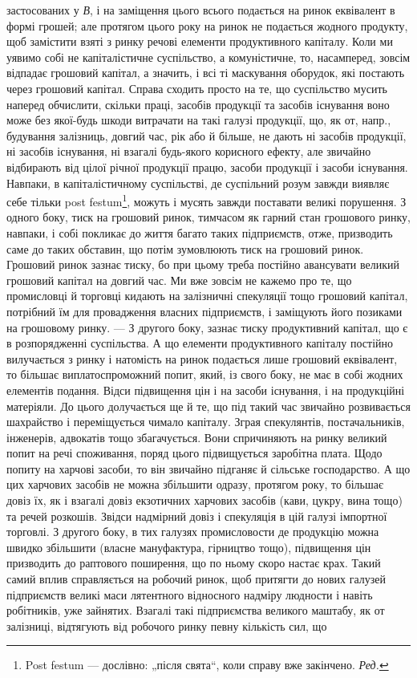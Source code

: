 \parcont{}  %
застосованих у \emph{В}, і на заміщення цього всього подається на ринок еквівалент
в формі грошей; але протягом цього року на ринок не подається
жодного продукту, щоб замістити взяті з ринку речові елементи продуктивного
капіталу. Коли ми уявимо собі не капіталістичне суспільство,
а комуністичне, то, насамперед, зовсім відпадає грошовий капітал, а значить,
і всі ті маскування оборудок, які постають через грошовий капітал.
Справа сходить просто на те, що суспільство мусить наперед обчислити,
скільки праці, засобів продукції та засобів існування воно може без якої-будь
шкоди витрачати на такі галузі продукції, що, як от, напр., будування
залізниць, довгий час, рік або й більше, не дають ні засобів
продукції, ні засобів існування, ні взагалі будь-якого корисного ефекту,
але звичайно відбирають від цілої річної продукції працю, засоби продукції
і засоби існування. Навпаки, в капіталістичному суспільстві, де
суспільний розум завжди виявляє себе тільки post festum\footnote*{
Post festum — дослівно: „після свята“, коли справу вже закінчено. \emph{Ред.}
}, можуть і мусять
завжди поставати великі порушення. З одного боку, тиск на грошовий
ринок, тимчасом як гарний стан грошового ринку, навпаки, і собі покликає
до життя багато таких підприємств, отже, призводить саме до таких обставин,
що потім зумовлюють тиск на грошовий ринок. Грошовий ринок
зазнає тиску, бо при цьому треба постійно авансувати великий грошовий
капітал на довгий час. Ми вже зовсім не кажемо про те, що промисловці
й торговці кидають на залізничні спекуляції тощо грошовий капітал,
потрібний їм для провадження власних підприємств, і заміщують його позиками
на грошовому ринку. — З другого боку, зазнає тиску продуктивний капітал,
що є в розпорядженні суспільства. А що елементи продуктивного капіталу
постійно вилучається з ринку і натомість на ринок подається лише
грошовий еквівалент, то більшає виплатоспроможний попит, який, із свого
боку, не має в собі жодних елементів подання. Відси підвищення цін
і на засоби існування, і на продукційні матеріяли. До цього долучається
ще й те, що під такий час звичайно розвивається шахрайство і переміщується
чимало капіталу. Зграя спекулянтів, постачальників, інженерів,
адвокатів тощо збагачується. Вони спричиняють на ринку великий попит
на речі споживання, поряд цього підвищується заробітна плата. Щодо
попиту на харчові засоби, то він звичайно підганяє й сільське господарство.
А що цих харчових засобів не можна збільшити одразу, протягом
року, то більшає довіз їх, як і взагалі довіз екзотичних харчових
засобів (кави, цукру, вина тощо) та речей розкошів. Звідси надмірний
довіз і спекуляція в цій галузі імпортної торговлі. З другого боку, в
тих галузях промисловости де продукцію можна швидко збільшити (власне
мануфактура, гірництво тощо), підвищення цін призводить до раптового
поширення, що по ньому скоро настає крах. Такий самий вплив
справляється на робочий ринок, щоб притягти до нових галузей підприємств
великі маси лятентного відносного надміру людности і навіть робітників,
уже зайнятих. Взагалі такі підприємства великого маштабу, як
от залізниці, відтягують від робочого ринку певну кількість сил, що
\parbreak{}  %

